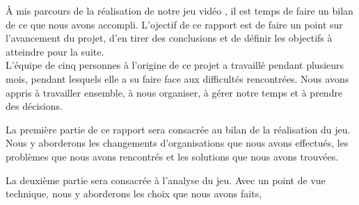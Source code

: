 
À mis parcours de la réalisation de notre jeu vidéo \gameName, il est temps de faire un bilan de ce que nous avons accompli.
L'ojectif de ce rapport est de faire un point sur l'avancement du projet, d'en tirer des conclusions et de définir les objectifs à atteindre pour la suite.
\\

L'équipe de cinq personnes à l'origine de ce projet a travaillé pendant plusieurs mois, pendant lesquels elle a su faire face aux difficultés rencontrées. Nous avons appris à travailler ensemble, à nous organiser, à gérer notre temps et à prendre des décisions. 



La première partie de ce rapport sera consacrée au bilan de la réalisation du jeu. Nous y aborderons les changements d'organisations que nous avons effectués, les problèmes que nous avons rencontrés et les solutions que nous avons trouvées.

La deuxième partie sera consacrée à l'analyse du jeu. Avec un point de vue technique, nous y aborderons les choix que nous avons faits, 


